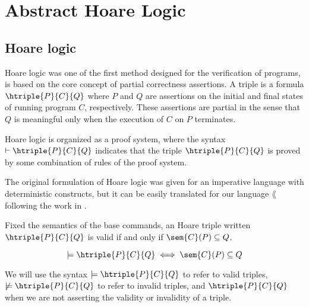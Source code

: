 \section{Abstract Hoare Logic}
\label{chp:intro-ahorare}

\subsection{Hoare logic}
Hoare logic  \cite{Hoare69, Floyd93} was one of the first method designed for 
the verification of programs, is based on the core concept of partial correctness 
assertions. A triple is a formula $\htriple{P}{C}{Q}$ where $P$ and $Q$ are 
assertions on the initial and final states of running program $C$, respectively. 
These assertions are partial in the sense that $Q$ is meaningful only when the 
execution of $C$ on $P$ terminates.

Hoare logic is organized as a proof system, where the syntax 
$\vdash \htriple{P}{C}{Q}$ indicates that the triple 
$\htriple{P}{C}{Q}$ is proved by some combination of rules of the proof system.

The original formulation of Hoare logic was given for an imperative language 
with deterministic constructs, but it can be easily translated for our language 
$\lang$ following the work in \cite{Moller21}.

\begin{definition}
  \label{def:hoare}
  Fixed the semantics of the base commands, an Hoare triple written 
  $\htriple{P}{C}{Q}$ is valid if and only if $\sem{C}(P) \subseteq Q$.

  $$\models \htriple{P}{C}{Q} \iff \sem{C}(P) \subseteq Q$$
\end{definition}

We will use the syntax $\models \htriple{P}{C}{Q}$ to refer to valid triples,
$\not \models \htriple{P}{C}{Q}$ to refer to invalid triples, and
$\htriple{P}{C}{Q}$ when we are not asserting the validity or invalidity of a
triple.

